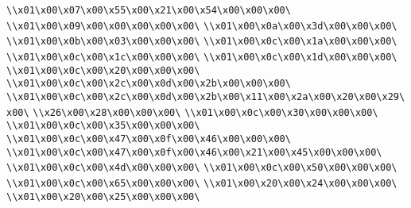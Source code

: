 \verb|\\x01\x00\x07\x00\x55\x00\x21\x00\x54\x00\x00\x00\|\newline
\verb|\\x01\x00\x09\x00\x00\x00\x00\x00\|\newline
\verb|\\x01\x00\x0a\x00\x3d\x00\x00\x00\|\newline
\verb|\\x01\x00\x0b\x00\x03\x00\x00\x00\|\newline
\verb|\\x01\x00\x0c\x00\x1a\x00\x00\x00\|\newline
\verb|\\x01\x00\x0c\x00\x1c\x00\x00\x00\|\newline
\verb|\\x01\x00\x0c\x00\x1d\x00\x00\x00\|\newline
\verb|\\x01\x00\x0c\x00\x20\x00\x00\x00\|\newline
\verb|\\x01\x00\x0c\x00\x2c\x00\x0d\x00\x2b\x00\x00\x00\|\newline
\verb|\\x01\x00\x0c\x00\x2c\x00\x0d\x00\x2b\x00\x11\x00\x2a\x00\x20\x00\x29\x00\|\newline
\verb|\\x26\x00\x28\x00\x00\x00\|\newline
\verb|\\x01\x00\x0c\x00\x30\x00\x00\x00\|\newline
\verb|\\x01\x00\x0c\x00\x35\x00\x00\x00\|\newline
\verb|\\x01\x00\x0c\x00\x47\x00\x0f\x00\x46\x00\x00\x00\|\newline
\verb|\\x01\x00\x0c\x00\x47\x00\x0f\x00\x46\x00\x21\x00\x45\x00\x00\x00\|\newline
\verb|\\x01\x00\x0c\x00\x4d\x00\x00\x00\|\newline
\verb|\\x01\x00\x0c\x00\x50\x00\x00\x00\|\newline
\verb|\\x01\x00\x0c\x00\x65\x00\x00\x00\|\newline
\verb|\\x01\x00\x20\x00\x24\x00\x00\x00\|\newline
\verb|\\x01\x00\x20\x00\x25\x00\x00\x00\|\newline
